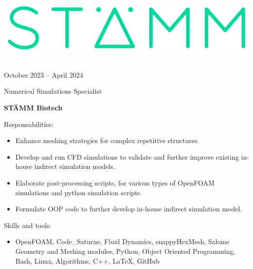 \documentclass[a4paper,10pt]{article}
\newlength{\cvcolumngapwidth}
\newlength{\cvleftcolumnwidth}
\newlength{\cvrightcolumnwidth}
\newcommand{\cvtitlestyle}[1]{{\large\cvtitlefont\textcolor{cvtitlecolor}{#1}}}
\newcommand{\cvdurationstyle}[1]{{\small\cvdurationfont\textcolor{cvdurationcolor}{#1}}}
\newlength{\cvafteritemskipamount}
\newlength{\cvaftertitleskipamount}
\newlength{\cvparskip}
\newcommand{\cvitem}[2]{
    \begin{minipage}[t]{\cvleftcolumnwidth}
        \raggedleft #1
    \end{minipage}%
    \hspace{\cvcolumngapwidth}%
    \begin{minipage}[t]{\cvrightcolumnwidth}
        \setlength{\parskip}{\cvparskip} #2
    \end{minipage}

    \vspace{\cvafteritemskipamount}
}
\newcommand{\cvtitle}[1]{
    \cvtitlestyle{#1}

    \vspace{\cvaftertitleskipamount}
    \vspace{-\cvparskip}
}
\begin{document}
\cvitem{
	\begin{minipage}{\textwidth}
    \begin{flushright}
		  \includegraphics[height=0.15\textwidth]{../logos-photos/Logo_STAMM.png}   
    \end{flushright}  
  \end{minipage} \\
  \vspace{0.3cm}
  \cvdurationstyle{October 2023 -- April 2024}\\
}{
	
  \cvtitle{Numerical Simulations Specialist}
  \textbf{\large STÄMM Biotech}

  
  Responsabilities:
  \begin{itemize}
    \item Enhance meshing strategies for complex repetitive structures. 
    \item Develop and run CFD simulations to validate and further improve existing in-house indirect simulation models.
    \item Elaborate post-processing scripts, for various types of OpenFOAM simulations and python simulation scripts.
    \item Formulate OOP code to further develop in-house indirect simulation model.
  \end{itemize}
  
  Skills and tools:
  \begin{itemize}
    \item OpenFOAM, Code\_Saturne, Fluid Dynamics, snappyHexMesh, Salome Geometry and Meshing modules, Python, Object Oriented
      Programming, Bash, Linux, Algorithms, C++, LaTeX, GitHub
  \end{itemize}
	
}
\end{document}
